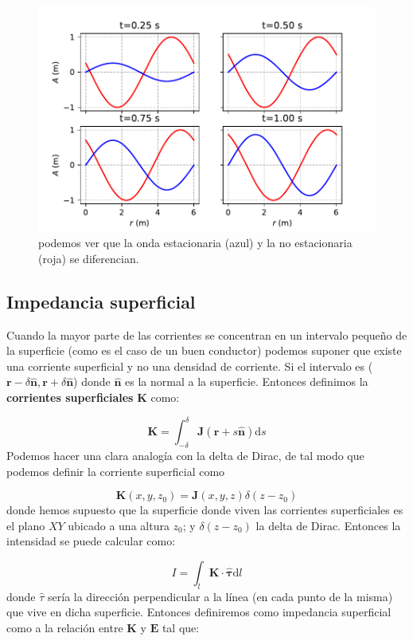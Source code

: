 \documentclass[12pt,a4paper]{article}
\newcommand{\D}{\mathrm{d}}
\newcommand{\En}{\mathbf{E}}
\newcommand{\Jn}{\mathbf{J}}
\newcommand{\Kn}{\mathbf{K}}
\newcommand{\rn}{\mathbf{r}}
\newcommand{\hnn}{\hat{\mathbf{n}}}
\numberwithin{equation}{section}
\numberwithin{figure}{section}
\begin{document}
\begin{figure}[h!] \centering
\includegraphics[scale=1]{comparacion.pdf}
\caption{podemos ver que la onda estacionaria (azul) y la no estacionaria (roja) se diferencian.}
\label{Fig:05.2.01}
\end{figure}
 

\subsection{Impedancia superficial}

Cuando la mayor parte de las corrientes se concentran en un intervalo pequeño de la superficie (como es el caso de un buen conductor) podemos suponer que existe una corriente superficial y no una densidad de corriente. Si el intervalo es ($\rn - \delta \hnn, \rn + \delta \hnn$) donde $\hnn$ es la normal a la superficie. Entonces definimos la \textbf{corrientes superficiales} $\Kn$ como:

\begin{equation}
\Kn = \int_{-\delta}^{\delta} \Jn (\rn + s \hnn) \D s
\end{equation}
Podemos hacer una clara analogía con la delta de Dirac, de tal modo que podemos definir la corriente superficial como

\begin{equation}
\Kn(x,y,z_0) = \Jn(x,y,z) \delta(z - z_0)
\end{equation}
donde hemos supuesto que la superficie donde viven las corrientes superficiales es el plano $XY$ ubicado a una altura $z_0$; y $\delta (z-z_0)$ la delta de Dirac. Entonces la intensidad se puede calcular como:

\begin{equation}
I = \int_l \Kn \cdot \mathbf{\hat{\tau}} \D l
\end{equation}
donde $\hat{\tau}$ sería la dirección perpendicular a la línea (en cada punto de la misma) que vive en dicha superficie. Entonces definiremos como impedancia superficial como a la relación entre $\Kn$ y $\En$ tal que:
\end{document}
